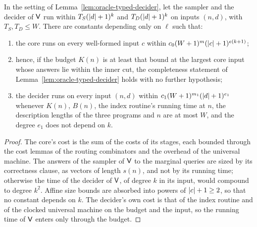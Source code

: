 \begin{lemma}
\label{lem:oracle-decider-time}
\leanok
In the setting of Lemma~\ref{lem:oracle-typed-decider}, let the sampler and the decider of
$\mathsf{V}$ run within $T_S(\left\vert {d} \right\vert + 1)^k$ and $T_D(\left\vert {d} \right\vert + 1)^k$ on inputs $(n, d)$, with
$T_S, T_D \leq W$. There are constants depending only on $\ell$ such that:
\begin{enumerate}
\item the core runs on every well-formed input $c$ within $c_0(W + 1)^m(\left\vert {c} \right\vert + 1)^{e(k + 1)}$;
\item hence, if the budget $K(n)$ is at least that bound at the largest core input whose answers
  lie within the inner cut, the completeness statement of Lemma~\ref{lem:oracle-typed-decider}
  holds with no further hypothesis;
\item the decider runs on every input $(n, d)$ within $c_1(W + 1)^{m_1}(\left\vert {d} \right\vert + 1)^{e_1}$ whenever
  $K(n)$, $B(n)$, the index routine's running time at $n$, the description lengths of the three
  programs and $n$ are at most $W$, and the degree $e_1$ does not depend on $k$.
\end{enumerate}
\end{lemma}
\begin{proof}
\leanok
The core's cost is the sum of the costs of its stages, each bounded through the cost lemmas of
the routing combinators and the overhead of the universal machine. The answers of the sampler of
$\mathsf{V}$ to the marginal queries are sized by its correctness clause, as vectors of length
$s(n)$, and not by its running time; otherwise the time of the decider of $\mathsf{V}$, of degree
$k$ in its input, would compound to degree $k^2$. Affine size bounds are absorbed into powers of
$\left\vert {c} \right\vert + 1 \geq 2$, so that no constant depends on $k$. The decider's own cost is that of the
index routine and of the clocked universal machine on the budget and the input, so the running
time of $\mathsf{V}$ enters only through the budget.
\end{proof}

